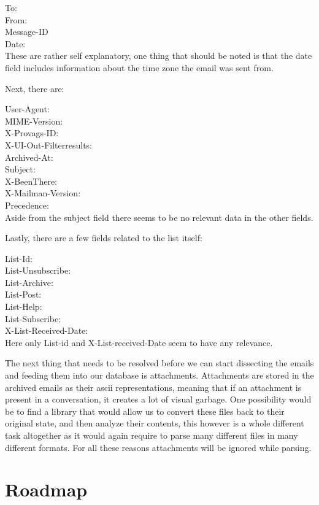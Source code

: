 \documentclass{report}
\begin{document}
To: \\
From:\\
Message-ID\\
Date: \\

These are rather self explanatory, one thing that should be noted is that the date field includes information about the time zone the email was sent from.

Next, there are:

User-Agent: \\
MIME-Version:\\
X-Provags-ID:\\
X-UI-Out-Filterresults:\\
Archived-At: \\
Subject:\\
X-BeenThere:\\
X-Mailman-Version: \\
Precedence: \\

Aside from the subject field there seems to be no relevant data in the other fields.

Lastly, there are a few fields related to the list itself:

List-Id:\\
List-Unsubscribe: \\
List-Archive: \\
List-Post: \\
List-Help: \\
List-Subscribe: \\
X-List-Received-Date:\\

Here only List-id and X-List-received-Date seem to have any relevance.

The next thing that needs to be resolved before we can start dissecting the emails and feeding them into our database is attachments. Attachments are stored in the archived emails as their ascii representations, meaning that if an attachment is present in a conversation, it creates a lot of visual garbage. One possibility would be to find a library that would allow us to convert these files back to their original state, and then analyze their contents, this however is a whole different task altogether as it would again require to parse many different files in many different formats. For all these reasons attachments will be ignored while parsing.

\chapter{Roadmap}
\end{document}
